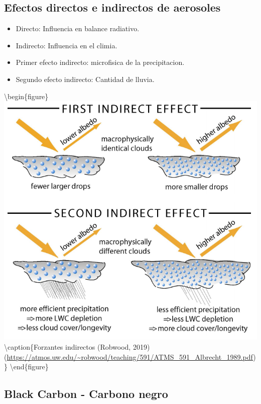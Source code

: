 \documentclass[]{book}
\providecommand{\tightlist}{%
  \setlength{\itemsep}{0pt}\setlength{\parskip}{0pt}}
\begin{document}
\hypertarget{efectos-directos-e-indirectos-de-aerosoles}{%
\subsection{Efectos directos e indirectos de aerosoles}\label{efectos-directos-e-indirectos-de-aerosoles}}

\begin{itemize}
\tightlist
\item
  Directo: Influencia en balance radiativo.
\item
  Indirecto: Influencia en el climia.
\item
  Primer efecto indirecto: microfisica de la precipitacion.
\item
  Segundo efecto indirecto: Cantidad de lluvia.
\end{itemize}

\textbackslash{}begin\{figure\}
\includegraphics[width=1.1\linewidth]{figs/fx} \textbackslash{}caption\{Forzantes indirectos (Robwood, 2019) (\url{https://atmos.uw.edu/~robwood/teaching/591/ATMS_591_Albrecht_1989.pdf})\}\label{fig:unnamed-chunk-19}
\textbackslash{}end\{figure\}

\hypertarget{black-carbon---carbono-negro}{%
\subsection{Black Carbon - Carbono negro}\label{black-carbon---carbono-negro}}
\end{document}
